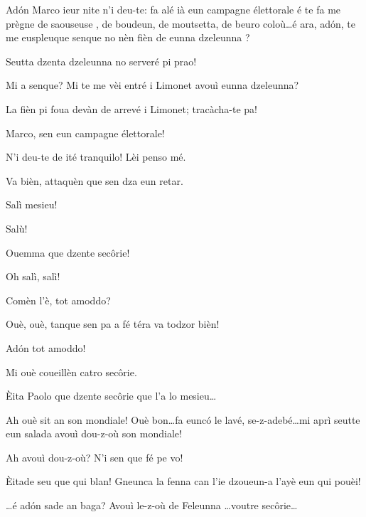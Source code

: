 \begin{drama}

\Cimaspeaks Ad\'on Marco ieur nite n'i deu-te: fa alé ià eun campagne élettorale é te fa me prègne de saouseuse \salan, de boudeun, de moutsetta, de beuro coloù\ldots é ara, ad\'on, te me euspleuque senque no nèn fièn de eunna dzeleunna \gallina ?

\Marcospeaks {} Seutta dzenta dzeleunna  no serveré pi prao!

\Cimaspeaks  Mi a senque? Mi te me vèi entré i Limonet avouì eunna dzeleunna?

\Marcospeaks La fièn pi foua devàn de arrevé i Limonet; tracàcha-te pa!

\Cimaspeaks Marco, sen eun campagne élettorale!

\Marcospeaks N'i deu-te de ité tranquilo! Lèi penso mé.

\Cimaspeaks  Va bièn, attaquèn que sen dza eun retar.


\Marcospeaks Salì mesieu!

\Pompiolenspeaks Salù!

\Marcospeaks Ouemma que dzente sec\^orie!

\Pompiolenspeaks Oh salì, salì!

\Cimaspeaks Comèn l'è, tot amoddo?

\Pompiolenspeaks Ouè, ouè, tanque sen pa a fé téra va todzor bièn!

\Cimaspeaks Ad\'on tot amoddo!

\Pompiolenspeaks Mi ouè coueillèn catro sec\^orie.

\Marcospeaks Èita Paolo que dzente sec\^orie que l'a lo mesieu\ldots

\Pompiolenspeaks Ah ouè sit an son mondiale! Ouè bon\ldots fa eunc\'o le lavé, se-z-adebé\ldots mi aprì seutte eun salada avouì dou-z-où \ou son mondiale!

\Marcospeaks Ah avouì dou-z-où? N'i sen que fé pe vo!


\Pompiolenspeaks {} Èitade seu que qui blan! Gneunca la fenna can l'ie dzoueun-a l'ayè eun qui pouèi!

\Cimaspeaks \ldots é ad\'on sade an baga? Avouì le-z-où de Feleunna \ldots  voutre sec\^orie\ldots 


\end{drama}
